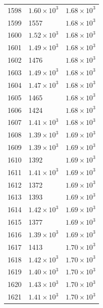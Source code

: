 \begin{table}[H]
\begin{tabular}{lll}
1598 & $\displaystyle 1.60 \times 10^{3}$ & $\displaystyle 1.68 \times 10^{3}$ \\
1599 & 1557 & $\displaystyle 1.68 \times 10^{3}$ \\
1600 & $\displaystyle 1.52 \times 10^{3}$ & $\displaystyle 1.68 \times 10^{3}$ \\
1601 & $\displaystyle 1.49 \times 10^{3}$ & $\displaystyle 1.68 \times 10^{3}$ \\
1602 & 1476 & $\displaystyle 1.68 \times 10^{3}$ \\
1603 & $\displaystyle 1.49 \times 10^{3}$ & $\displaystyle 1.68 \times 10^{3}$ \\
1604 & $\displaystyle 1.47 \times 10^{3}$ & $\displaystyle 1.68 \times 10^{3}$ \\
1605 & 1465 & $\displaystyle 1.68 \times 10^{3}$ \\
1606 & 1424 & $\displaystyle 1.68 \times 10^{3}$ \\
1607 & $\displaystyle 1.41 \times 10^{3}$ & $\displaystyle 1.68 \times 10^{3}$ \\
1608 & $\displaystyle 1.39 \times 10^{3}$ & $\displaystyle 1.69 \times 10^{3}$ \\
1609 & $\displaystyle 1.39 \times 10^{3}$ & $\displaystyle 1.69 \times 10^{3}$ \\
1610 & 1392 & $\displaystyle 1.69 \times 10^{3}$ \\
1611 & $\displaystyle 1.41 \times 10^{3}$ & $\displaystyle 1.69 \times 10^{3}$ \\
1612 & 1372 & $\displaystyle 1.69 \times 10^{3}$ \\
1613 & 1393 & $\displaystyle 1.69 \times 10^{3}$ \\
1614 & $\displaystyle 1.42 \times 10^{3}$ & $\displaystyle 1.69 \times 10^{3}$ \\
1615 & 1377 & $\displaystyle 1.69 \times 10^{3}$ \\
1616 & $\displaystyle 1.39 \times 10^{3}$ & $\displaystyle 1.69 \times 10^{3}$ \\
1617 & 1413 & $\displaystyle 1.70 \times 10^{3}$ \\
1618 & $\displaystyle 1.42 \times 10^{3}$ & $\displaystyle 1.70 \times 10^{3}$ \\
1619 & $\displaystyle 1.40 \times 10^{3}$ & $\displaystyle 1.70 \times 10^{3}$ \\
1620 & $\displaystyle 1.43 \times 10^{3}$ & $\displaystyle 1.70 \times 10^{3}$ \\
1621 & $\displaystyle 1.41 \times 10^{3}$ & $\displaystyle 1.70 \times 10^{3}$ \\

\end{tabular}
\end{table}
